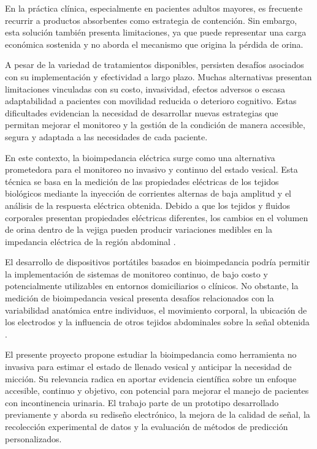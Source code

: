 \documentclass[12pt,a4paper]{article}
\begin{document}
En la práctica clínica, especialmente en pacientes adultos mayores, es frecuente recurrir a
productos absorbentes como estrategia de contención. Sin embargo, esta solución también presenta
limitaciones, ya que puede representar una carga económica sostenida y no aborda el mecanismo que
origina la pérdida de orina.

A pesar de la variedad de tratamientos disponibles, persisten desafíos asociados con su
implementación y efectividad a largo plazo. Muchas alternativas presentan limitaciones vinculadas
con su costo, invasividad, efectos adversos o escasa adaptabilidad a pacientes con movilidad
reducida o deterioro cognitivo. Estas dificultades evidencian la necesidad de desarrollar nuevas
estrategias que permitan mejorar el monitoreo y la gestión de la condición de manera accesible,
segura y adaptada a las necesidades de cada paciente.

En este contexto, la bioimpedancia eléctrica surge como una alternativa prometedora para el
monitoreo no invasivo y continuo del estado vesical. Esta técnica se basa en la medición de las
propiedades eléctricas de los tejidos biológicos mediante la inyección de corrientes alternas de
baja amplitud y el análisis de la respuesta eléctrica obtenida. Debido a que los tejidos y fluidos
corporales presentan propiedades eléctricas diferentes, los cambios en el volumen de orina dentro
de la vejiga pueden producir variaciones medibles en la impedancia eléctrica de la región abdominal
\cite{abbey1983bladder,liao2011bladder}.

El desarrollo de dispositivos portátiles basados en bioimpedancia podría permitir la implementación
de sistemas de monitoreo continuo, de bajo costo y potencialmente utilizables en entornos
domiciliarios o clínicos. No obstante, la medición de bioimpedancia vesical presenta desafíos
relacionados con la variabilidad anatómica entre individuos, el movimiento corporal, la ubicación
de los electrodos y la influencia de otros tejidos abdominales sobre la señal obtenida
\cite{palla2023review}.

El presente proyecto propone estudiar la bioimpedancia como herramienta no invasiva para estimar el
estado de llenado vesical y anticipar la necesidad de micción. Su relevancia radica en aportar
evidencia científica sobre un enfoque accesible, continuo y objetivo, con potencial para mejorar el
manejo de pacientes con incontinencia urinaria. El trabajo parte de un prototipo desarrollado
previamente y aborda su rediseño electrónico, la mejora de la calidad de señal, la recolección
experimental de datos y la evaluación de métodos de predicción personalizados.
\end{document}
